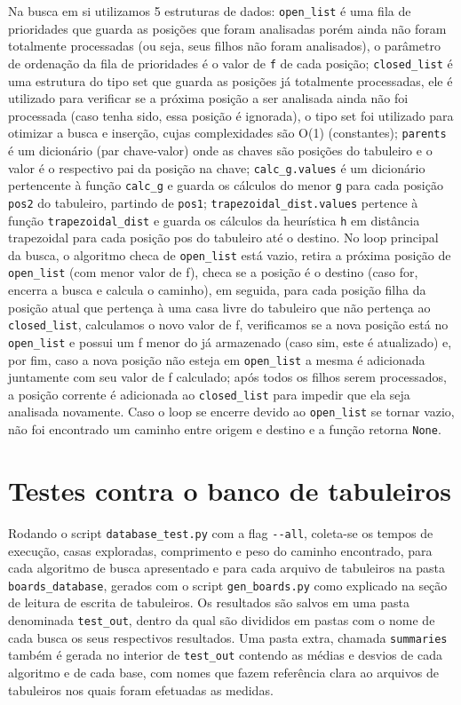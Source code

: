 \documentclass[12pt]{article}
\begin{document}
Na busca em si utilizamos 5 estruturas de dados: \verb|open_list| é uma fila de prioridades que guarda as posições que foram analisadas porém ainda não foram totalmente processadas (ou seja, seus filhos não foram analisados), o parâmetro de ordenação da fila de prioridades é o valor de \verb|f| de cada posição; \verb|closed_list| é uma estrutura do tipo set que guarda as posições já totalmente processadas, ele é utilizado para verificar se a próxima posição a ser analisada ainda não foi processada (caso tenha sido, essa posição é ignorada), o tipo set foi utilizado para otimizar a busca e inserção, cujas complexidades são O(1) (constantes); \verb|parents| é um dicionário (par chave-valor) onde as chaves são posições do tabuleiro e o valor é o respectivo pai da posição na chave; \verb|calc_g.values| é um dicionário pertencente à função \verb|calc_g| e guarda os cálculos do menor \verb|g| para cada posição \verb|pos2| do tabuleiro, partindo de \verb|pos1|; \verb|trapezoidal_dist.values| pertence à função \verb|trapezoidal_dist| e guarda os cálculos da heurística \verb|h| em distância trapezoidal para cada posição pos do tabuleiro até o destino. No loop principal da busca, o algoritmo checa de \verb|open_list| está vazio, retira a próxima posição de \verb|open_list| (com menor valor de f), checa se a posição é o destino (caso for, encerra a busca e calcula o caminho), em seguida, para cada posição filha da posição atual que pertença à uma casa livre do tabuleiro que não pertença ao \verb|closed_list|, calculamos o novo valor de f, verificamos se a nova posição está no \verb|open_list| e possui um f menor do já armazenado (caso sim, este é atualizado) e, por fim, caso a nova posição não esteja em \verb|open_list| a mesma é adicionada juntamente com seu valor de f calculado; após todos os filhos serem processados, a posição corrente é adicionada ao \verb|closed_list| para impedir que ela seja analisada novamente. Caso o loop se encerre devido ao \verb|open_list| se tornar vazio, não foi encontrado um caminho entre origem e destino e a função retorna \verb|None|.

\section{Testes contra o banco de tabuleiros}
Rodando o script \verb|database_test.py| com a flag \verb|--all|, coleta-se os tempos de execução, casas exploradas, comprimento e peso do caminho encontrado, para cada algoritmo de busca apresentado e para cada  arquivo de tabuleiros na pasta \verb|boards_database|, gerados com o script \verb|gen_boards.py| como explicado na seção de leitura de escrita de tabuleiros. Os resultados são salvos em uma pasta denominada \verb|test_out|, dentro da qual são divididos em pastas com o nome de cada busca os seus respectivos resultados. Uma pasta extra, chamada \verb|summaries| também é gerada no interior de \verb|test_out| contendo as médias e desvios de cada algoritmo e de cada base, com nomes que fazem referência clara ao arquivos de tabuleiros nos quais foram efetuadas as medidas.\\
\end{document}
